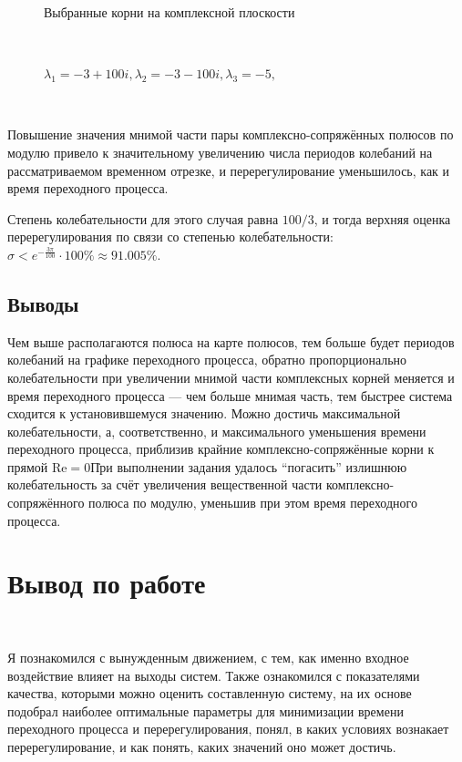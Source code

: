 \documentclass[a4paper]{article}
\begin{document}
\begin{figure}[H]
\begin{minipage}{0.5\textwidth}
        \caption{$\lambda_1=-3+100i, \lambda_2=-3-100i, \lambda_3=-5,$}
        \centerline{Выбранные корни на комплексной плоскости}
    \end{minipage}\\[1em]
\end{figure}\noindent\

Повышение значения мнимой части пары комплексно-сопряжённых полюсов по модулю привело к значительному увеличению числа периодов колебаний на рассматриваемом временном отрезке, и перерегулирование уменьшилось, как и время переходного процесса.\ 

Степень колебательности для этого случая равна $100/3$, и тогда верхняя оценка перерегулирования по связи со степенью колебательности: $\sigma < e^{-\frac{3\pi}{100}}\cdot 100\% \approx 91.005\%$.

\subsection{Выводы}

Чем выше располагаются полюса на карте полюсов, тем больше будет периодов колебаний на графике переходного процесса, обратно пропорционально колебательности при увеличении мнимой части комплексных корней меняется и время переходного процесса --- чем больше мнимая часть, тем быстрее система сходится к установившемуся значению. Можно достичь максимальной колебательности, а, соответственно, и максимального уменьшения времени переходного процесса, приблизив крайние комплексно-сопряжённые корни к прямой $\text{Re}=0$\.

При выполнении задания удалось ``погасить'' излишнюю колебательность за счёт увеличения вещественной части комплексно-сопряжённого полюса по модулю, уменьшив при этом время переходного процесса.

\section{Вывод по работе}\

Я познакомился с вынужденным движением, с тем, как именно входное воздействие влияет на выходы систем. Также ознакомился с показателями качества, которыми можно оценить составленную систему, на их основе подобрал наиболее оптимальные параметры для минимизации времени переходного процесса и перерегулирования, понял, в каких условиях вознакает перерегулирование, и как понять, каких значений оно может достичь.

\newpage
\end{document}
